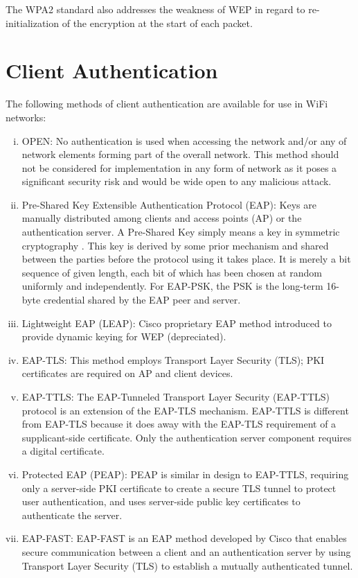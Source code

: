 The WPA2 standard also addresses the weakness of WEP in regard to
re-initialization of the encryption at the start of each packet.

\section{Client Authentication}

The following methods of client authentication are available for use in WiFi networks:

\begin{enumerate}[(i)]
\item OPEN: No authentication is used when accessing the network and/or
any of network elements forming part of the overall network. This method
should not be considered for implementation in any form of network
as it poses a significant security risk and would be wide open to any
malicious attack.

\item Pre-Shared Key Extensible Authentication Protocol (EAP): Keys
are manually distributed among clients and access points (AP) or the
authentication server. A Pre-Shared Key simply means a key in symmetric
cryptography \cite{EAP_PSK}.  This key is derived by some prior mechanism
and shared between the parties before the protocol using it takes place.
It is merely a bit sequence of given length, each bit of which has been
chosen at random uniformly and independently.  For EAP-PSK, the PSK is
the long-term 16-byte credential shared by the EAP peer and server.

\item Lightweight EAP (LEAP): Cisco proprietary EAP method introduced
to provide dynamic keying for WEP (depreciated).

\item EAP-TLS: This method employs Transport Layer Security (TLS);
PKI certificates are required on AP and client devices.

\item EAP-TTLS: The EAP-Tunneled Transport Layer Security (EAP-TTLS)
protocol is an extension of the EAP-TLS mechanism. EAP-TTLS is different
from EAP-TLS because it does away with the EAP-TLS requirement of a
supplicant-side certificate. Only the authentication server component
requires a digital certificate.

\item Protected EAP (PEAP): PEAP is similar in design to EAP-TTLS,
requiring only a server-side PKI certificate to create a secure TLS
tunnel to protect user  authentication, and uses server-side public key
certificates to authenticate the server.

\item EAP-FAST: EAP-FAST is an EAP method developed by Cisco that
enables secure communication between a client and an authentication
server by using Transport Layer Security (TLS) to establish a mutually
authenticated tunnel.
\end{enumerate}


